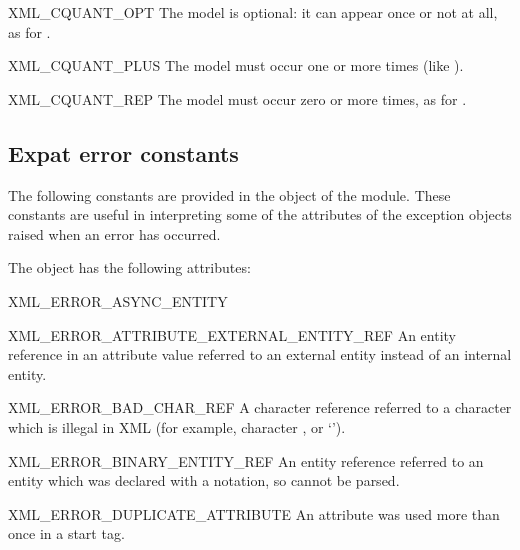\begin{datadescni}{XML_CQUANT_OPT}
The model is optional: it can appear once or not at all, as for
.
\end{datadescni}

\begin{datadescni}{XML_CQUANT_PLUS}
The model must occur one or more times (like ).
\end{datadescni}

\begin{datadescni}{XML_CQUANT_REP}
The model must occur zero or more times, as for .
\end{datadescni}


\subsection{Expat error constants \label{expat-errors}}

The following constants are provided in the  object of
the  module.  These constants are useful
in interpreting some of the attributes of the 
exception objects raised when an error has occurred.

The  object has the following attributes:

\begin{datadescni}{XML_ERROR_ASYNC_ENTITY}
\end{datadescni}

\begin{datadescni}{XML_ERROR_ATTRIBUTE_EXTERNAL_ENTITY_REF}
An entity reference in an attribute value referred to an external
entity instead of an internal entity.
\end{datadescni}

\begin{datadescni}{XML_ERROR_BAD_CHAR_REF}
A character reference referred to a character which is illegal in XML
(for example, character , or `').
\end{datadescni}

\begin{datadescni}{XML_ERROR_BINARY_ENTITY_REF}
An entity reference referred to an entity which was declared with a
notation, so cannot be parsed.
\end{datadescni}

\begin{datadescni}{XML_ERROR_DUPLICATE_ATTRIBUTE}
An attribute was used more than once in a start tag.
\end{datadescni}


